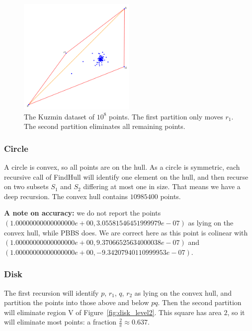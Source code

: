 \begin{figure}[ht]
    \centering
    \includegraphics[width=0.5\textwidth]{./figures/rust-kuzmin.png}
    \caption{The Kuzmin dataset of $10^8$ points. The first partition only
             moves $r_1$. The second partition eliminates all remaining points.}
    \label{fig:kuzmin}
\end{figure}

\subsubsection{Circle}

A circle is convex, so all points are on the hull. As a circle is symmetric,
each recursive call of FindHull will identify one element on the hull, and
then recurse on two subsets $S_1$ and $S_2$ differing at most one in size.
That means we have a deep recursion. The convex hull contains $10985400$
points.

\textbf{A note on accuracy: }we do not report the points
$(1.00000000000000000e+00, 3.05581546451999979e-07)$ as lying on the convex
hull, while PBBS does. We are correct here as this point is colinear with
$(1.00000000000000000e+00, 9.37066525634000038e-07)$ and
$(1.00000000000000000e+00, -9.34207940110999953e-07)$.

\subsubsection{Disk}

The first recursion will identify $p$, $r_1$, $q$, $r_2$ as lying on the
convex hull, and partition the points into those above and below $pq$.
Then the second partition will eliminate region V of 
Figure~\ref{fig:disk_level2}. This square has area $2$, so it will eliminate
most points: a fraction $\frac{2}{\pi} \approx 0.637$.

